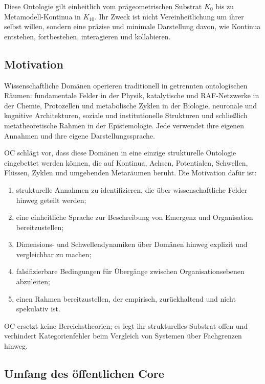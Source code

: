 Diese Ontologie gilt einheitlich vom prägeometrischen Substrat \(K_0\) bis zu Metamodell-Kontinua in \(K_{10}\). Ihr Zweck ist nicht Vereinheitlichung um ihrer selbst willen, sondern eine präzise und minimale Darstellung davon, wie Kontinua entstehen, fortbestehen, interagieren und kollabieren.

\subsection{Motivation}

Wissenschaftliche Domänen operieren traditionell in getrennten ontologischen Räumen: fundamentale Felder in der Physik, katalytische und RAF-Netzwerke in der Chemie, Protozellen und metabolische Zyklen in der Biologie, neuronale und kognitive Architekturen, soziale und institutionelle Strukturen und schließlich metatheoretische Rahmen in der Epistemologie. Jede verwendet ihre eigenen Annahmen und ihre eigene Darstellungssprache.

OC schlägt vor, dass diese Domänen in eine einzige strukturelle Ontologie eingebettet werden können, die auf Kontinua, Achsen, Potentialen, Schwellen, Flüssen, Zyklen und umgebenden Metaräumen beruht. Die Motivation dafür ist:

\begin{enumerate}
    \item strukturelle Annahmen zu identifizieren, die über wissenschaftliche Felder hinweg geteilt werden;
    \item eine einheitliche Sprache zur Beschreibung von Emergenz und Organisation bereitzustellen;
    \item Dimensions- und Schwellendynamiken über Domänen hinweg explizit und vergleichbar zu machen;
    \item falsifizierbare Bedingungen für Übergänge zwischen Organisationsebenen abzuleiten;
    \item einen Rahmen bereitzustellen, der empirisch, zurückhaltend und nicht spekulativ ist.
\end{enumerate}

OC ersetzt keine Bereichstheorien; es legt ihr strukturelles Substrat offen und verhindert Kategorienfehler beim Vergleich von Systemen über Fachgrenzen hinweg.

\subsection{Umfang des öffentlichen Core}

